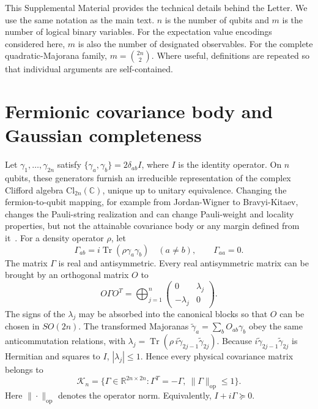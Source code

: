 \documentclass[10pt,aps,pra,twocolumn,superscriptaddress,nofootinbib,longbibliography]{revtex4-2}
\newcommand{\Tr}{\operatorname{Tr}}
\newcommand{\R}{\mathbb{R}}
\newcommand{\op}{\mathrm{op}}
\newcommand{\calK}{\mathcal{K}}
\begin{document}
{
This Supplemental Material provides the technical details behind the Letter.  We use the same notation as the main text.  $n$ is the number of qubits and $m$ is the number of logical binary variables.  For the expectation value encodings considered here, $m$ is also the number of designated observables.  For the complete quadratic-Majorana family, $m=\binom{2n}{2}$.  Where useful, definitions are repeated so that individual arguments are self-contained.

\section{Fermionic covariance body and Gaussian completeness}
\label{supp:gaussian}
Let $\gamma_1,\ldots,\gamma_{2n}$ satisfy $\{\gamma_a,\gamma_b\}=2\delta_{ab}I$, where $I$ is the identity operator.  On $n$ qubits, these generators furnish an irreducible representation of the complex Clifford algebra $\mathrm{Cl}_{2n}(\mathbb C)$, unique up to unitary equivalence.  Changing the fermion-to-qubit mapping, for example from Jordan-Wigner to Bravyi-Kitaev, changes the Pauli-string realization and can change Pauli-weight and locality properties, but not the attainable covariance body or any margin defined from it~\cite{Bravyi2005Lagrangian,Seeley2012BravyiKitaev}.  For a density operator $\rho$, let
\begin{equation}
  \Gamma_{ab}=i\Tr(\rho\gamma_a\gamma_b)\quad(a\neq b),\qquad \Gamma_{aa}=0.
  \label{eq:s-cov}
\end{equation}
The matrix $\Gamma$ is real and antisymmetric.  Every real antisymmetric matrix can be brought by an orthogonal matrix $O$ to
\begin{equation}
    O\Gamma O^T=\bigoplus_{j=1}^{n}
    \begin{pmatrix}0&\lambda_j\\-\lambda_j&0\end{pmatrix}.
    \label{eq:s-canonical-Gamma}
\end{equation}
The signs of the $\lambda_j$ may be absorbed into the canonical blocks so that $O$ can be chosen in $SO(2n)$.  The transformed Majoranas $\tilde\gamma_a=\sum_bO_{ab}\gamma_b$ obey the same anticommutation relations, with $\lambda_j=\Tr\!\left(\rho\,i\tilde\gamma_{2j-1}\tilde\gamma_{2j}\right)$.  Because $i\tilde\gamma_{2j-1}\tilde\gamma_{2j}$ is Hermitian and squares to $I$, $|\lambda_j|\le1$.  Hence every physical covariance matrix belongs to
\begin{equation}
  \calK_n=\{\Gamma\in\R^{2n\times2n}:\Gamma^T=-\Gamma,\ \|\Gamma\|_{\op}\le1\}.
  \label{eq:s-Kn}
\end{equation}
Here $\|\cdot\|_{\op}$ denotes the operator norm.  Equivalently, $I+i\Gamma\succeq0$.

}
\end{document}
